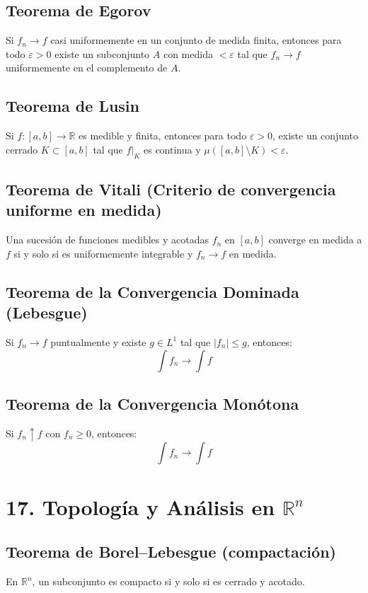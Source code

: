 \documentclass[12pt]{article}
\begin{document}
\subsection{Teorema de Egorov}
Si \(f_n \to f\) casi uniformemente en un conjunto de medida finita, entonces para todo \(\varepsilon > 0\) existe un subconjunto \(A\) con medida \(< \varepsilon\) tal que \(f_n \to f\) uniformemente en el complemento de \(A\).

\subsection{Teorema de Lusin}
Si \(f: [a,b] \to \mathbb{R}\) es medible y finita, entonces para todo \(\varepsilon > 0\), existe un conjunto cerrado \(K \subset [a,b]\) tal que \(f|_K\) es continua y \(\mu([a,b] \setminus K) < \varepsilon\).

\subsection{Teorema de Vitali (Criterio de convergencia uniforme en medida)}
Una sucesión de funciones medibles y acotadas \(f_n\) en \([a,b]\) converge en medida a \(f\) si y solo si es uniformemente integrable y \(f_n \to f\) en medida.

\subsection{Teorema de la Convergencia Dominada (Lebesgue)}
Si \(f_n \to f\) puntualmente y existe \(g \in L^1\) tal que \(|f_n| \leq g\), entonces:
\[
\int f_n \to \int f
\]

\subsection{Teorema de la Convergencia Monótona}
Si \(f_n \uparrow f\) con \(f_n \geq 0\), entonces:
\[
\int f_n \to \int f
\]

\section{17. Topología y Análisis en \(\mathbb{R}^n\)}

\subsection{Teorema de Borel–Lebesgue (compactación)}
En \(\mathbb{R}^n\), un subconjunto es compacto si y solo si es cerrado y acotado.
\end{document}
